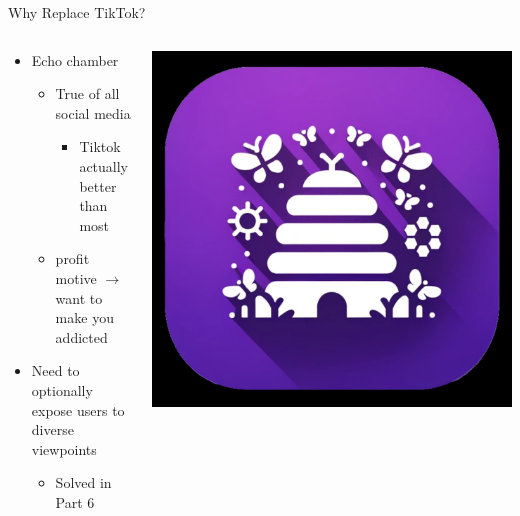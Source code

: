 \documentclass[aspectratio=169]{beamer}
\begin{document}
\begin{frame}{Why Replace TikTok?}
\begin{columns}[T]
    \begin{column}[T]{0.5\textwidth}
        \begin{itemize}
            \item Echo chamber
            \begin{itemize}
                \item True of all social media
                \begin{itemize}
                    \item Tiktok actually better than most
                \end{itemize}
                \item profit motive $\rightarrow$ want to make you addicted
            \end{itemize}
            \item Need to optionally expose users to diverse viewpoints
            \begin{itemize}
                \item Solved in Part 6
            \end{itemize}
        \end{itemize}
    \end{column}
    \begin{column}{0.5\textwidth}
        \includegraphics[height=0.8\textheight]{imgs/app_icons/2.png}
    \end{column}
\end{columns}
\end{frame}
\end{document}
